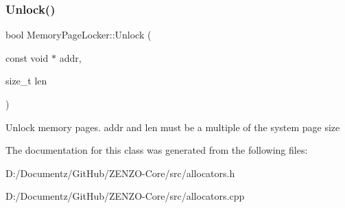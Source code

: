 \subsubsection{\texorpdfstring{Unlock()}{Unlock()}}
{\footnotesize\ttfamily bool Memory\+Page\+Locker\+::\+Unlock (\begin{DoxyParamCaption}\item[{const void $\ast$}]{addr,  }\item[{size\+\_\+t}]{len }\end{DoxyParamCaption})}

Unlock memory pages. addr and len must be a multiple of the system page size 

The documentation for this class was generated from the following files\+:\begin{DoxyCompactItemize}
\item 
D\+:/\+Documentz/\+Git\+Hub/\+Z\+E\+N\+Z\+O-\/\+Core/src/allocators.\+h\item 
D\+:/\+Documentz/\+Git\+Hub/\+Z\+E\+N\+Z\+O-\/\+Core/src/allocators.\+cpp\end{DoxyCompactItemize}
